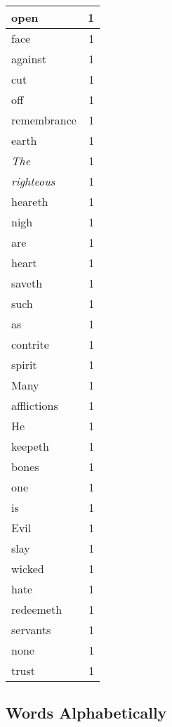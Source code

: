\begin{center}
\begin{longtable}{l|r}
{open} & 1 \\ \hline
face & 1 \\ \hline
against & 1 \\ \hline
cut & 1 \\ \hline
off & 1 \\ \hline
remembrance & 1 \\ \hline
earth & 1 \\ \hline
\emph{The} & 1 \\ \hline
\emph{righteous} & 1 \\ \hline
heareth & 1 \\ \hline
nigh & 1 \\ \hline
are & 1 \\ \hline
heart & 1 \\ \hline
saveth & 1 \\ \hline
such & 1 \\ \hline
as & 1 \\ \hline
contrite & 1 \\ \hline
spirit & 1 \\ \hline
Many & 1 \\ \hline
afflictions & 1 \\ \hline
He & 1 \\ \hline
keepeth & 1 \\ \hline
bones & 1 \\ \hline
one & 1 \\ \hline
is & 1 \\ \hline
Evil & 1 \\ \hline
slay & 1 \\ \hline
wicked & 1 \\ \hline
hate & 1 \\ \hline
redeemeth & 1 \\ \hline
servants & 1 \\ \hline
none & 1 \\ \hline
trust & 1 \\ \hline
\end{longtable}
\end{center}



\normalsize



\subsection{Words Alphabetically}


